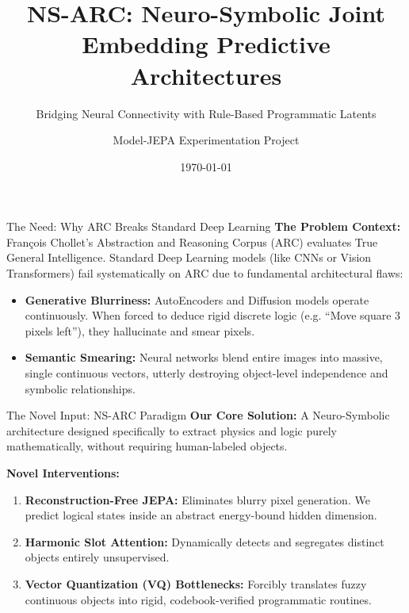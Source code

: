 \documentclass[aspectratio=169, 10pt]{beamer}
\title[NS-ARC Architecture]{NS-ARC: Neuro-Symbolic Joint Embedding Predictive Architectures}
\subtitle{Bridging Neural Connectivity with Rule-Based Programmatic Latents}
\author[Model-JEPA]{Model-JEPA Experimentation Project}
\date{\today}
\begin{document}
\frame{\titlepage}

\begin{frame}{The Need: Why ARC Breaks Standard Deep Learning}
    \textbf{The Problem Context:}
    François Chollet's Abstraction and Reasoning Corpus (ARC) evaluates True General Intelligence. Standard Deep Learning models (like CNNs or Vision Transformers) fail systematically on ARC due to fundamental architectural flaws:
    \vspace{0.3cm}
    \begin{itemize}
        \item \textbf{Generative Blurriness:} AutoEncoders and Diffusion models operate continuously. When forced to deduce rigid discrete logic (e.g. ``Move square 3 pixels left''), they hallucinate and smear pixels.
        \item \textbf{Semantic Smearing:} Neural networks blend entire images into massive, single continuous vectors, utterly destroying object-level independence and symbolic relationships.
    \end{itemize}
\end{frame}

\begin{frame}{The Novel Input: NS-ARC Paradigm}
    \textbf{Our Core Solution:} 
    A Neuro-Symbolic architecture designed specifically to extract physics and logic purely mathematically, without requiring human-labeled objects.
    
    \vspace{0.3cm}
    \textbf{Novel Interventions:}
    \begin{enumerate}
        \item \textbf{Reconstruction-Free JEPA:} Eliminates blurry pixel generation. We predict logical states inside an abstract energy-bound hidden dimension.
        \item \textbf{Harmonic Slot Attention:} Dynamically detects and segregates distinct objects entirely unsupervised.
        \item \textbf{Vector Quantization (VQ) Bottlenecks:} Forcibly translates fuzzy continuous objects into rigid, codebook-verified programmatic routines.
    \end{enumerate}
\end{frame}
\end{document}
